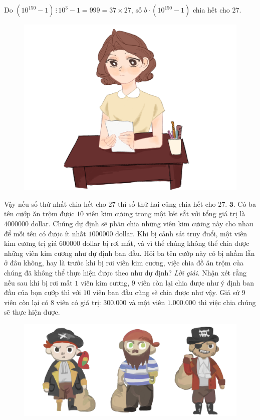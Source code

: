 \begin{multicols}{2}
	\vskip 0.1cm 
	Do $(10^{150}-1) \,\vdots\, 10^3-1=999=37\times27$, số $b\cdot(10^{150}-1)$ chia hết cho $27$.
	\begin{figure}[H]
		\centering
		\vspace*{-5pt}
		\captionsetup{labelformat= empty, justification=centering}
		\includegraphics[width=0.85\linewidth]{Hinh2}
		\vspace*{-5pt}
	\end{figure}
	Vậy nếu số thứ nhất chia hết cho $27$ thì số thứ hai cũng chia hết cho $27$.
	\vskip 0.1cm
	$\pmb{3.}$ Có ba tên cướp ăn trộm được $10$ viên kim cương trong một két sắt với tổng giá trị là $4 000 000$ dollar. Chúng dự định sẽ phân chia những viên kim cương này cho nhau để mỗi tên có được ít nhất $1 000 000$ dollar. Khi bị cảnh sát truy đuổi, một viên kim cương trị giá $600 000$ dollar bị rơi mất, và vì thế chúng không thể chia được những viên kim cương như dự định ban đầu. Hỏi ba tên cướp này có bị nhầm lẫn ở đâu không, hay là trước khi bị rơi viên kim cương, việc chia đồ ăn trộm của chúng đã không thể thực hiện được theo như dự định?
	\vskip 0.1cm
	\textit{Lời giải.} Nhận xét rằng nếu sau khi bị rơi mất $1$ viên kim cương, $9$ viên còn lại chia được như ý định ban đầu của bọn cướp thì với $10$ viên ban đầu cũng sẽ chia được như vậy. Giả sử $9$ viên còn lại có  $8$ viên có giá trị: $300.000$ và một viên $1.000.000$ thì việc chia chúng sẽ thực hiện được.
	\begin{figure}[H]
		\centering
		\vspace*{-5pt}
		\captionsetup{labelformat= empty, justification=centering}
		\includegraphics[width=1\linewidth]{Hinh3}

\end{figure}
\end{multicols}

